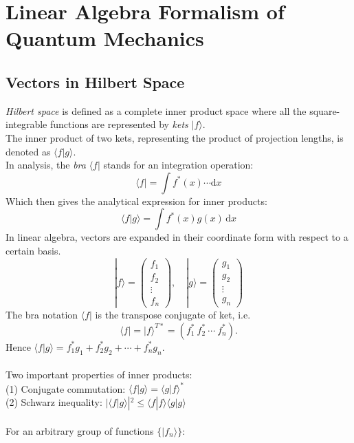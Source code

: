 	\chapter{Linear Algebra Formalism of Quantum Mechanics}
	
	\section{Vectors in Hilbert Space}
	
	\emph{Hilbert space} is defined as a complete inner product space 
	where all the square-integrable functions are represented by \emph{kets} $|f\rangle$.\\
	The inner product of two kets, representing the product of projection lengths, is denoted as $\langle f | g \rangle$.\\
	In analysis, the \emph{bra} $\langle f |$ stands for an integration operation:
	\[
		\langle f | = \int\! f^{*}(x)\cdots\text{d}x
	\]
	Which then gives the analytical expression for inner products:
	\[
		\langle f | g \rangle = \int\! f^{*}(x)g(x)\,\text{d}x
	\]
	In linear algebra, 
	vectors are expanded in their coordinate form with respect to a certain basis.
	\[
		| f \rangle = 
		\begin{pmatrix}
			f_1 \\ f_2 \\ \vdots \\ f_n
		\end{pmatrix},
		\quad 
		|g\rangle =
		\begin{pmatrix}
			g_1 \\ g_2 \\ \vdots \\ g_n
		\end{pmatrix}
	\]
	The bra notation $\langle f |$ is the transpose conjugate of ket, i.e.
	\[\langle f | = | f \rangle^{T*} = (f_{1}^{*}\ f_{2}^{*}\ \cdots \ f_{n}^{*}).\]
	Hence $\langle f | g \rangle = f_{1}^{*}g_1 + f_{2}^{*}g_2 + \cdots + f_{n}^{*}g_n$.\\ \\
	Two important properties of inner products:\\
	(1) Conjugate commutation: $\langle f | g \rangle = \langle g | f \rangle^{*} \qquad$ \\       
	(2) Schwarz inequality: $|\langle f | g \rangle|^{2} \leq \langle f | f \rangle \langle g | g \rangle$\\ \\
	For an arbitrary group of functions $\{|f_n\rangle\}$: \\
